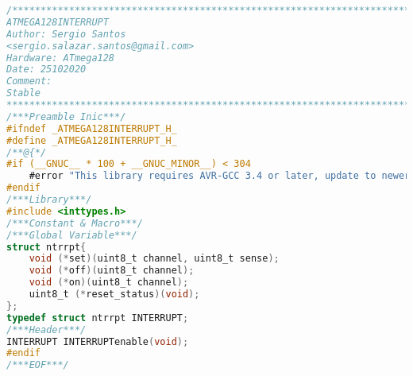 \begin{lstlisting}[language=C, caption={atmega128interrupt.h}, label=atmega128interrupt-h, captionpos=b]
/************************************************************************
ATMEGA128INTERRUPT
Author: Sergio Santos 
<sergio.salazar.santos@gmail.com>
Hardware: ATmega128
Date: 25102020
Comment:
Stable
************************************************************************/
/***Preamble Inic***/
#ifndef _ATMEGA128INTERRUPT_H_
#define _ATMEGA128INTERRUPT_H_
/**@{*/
#if (__GNUC__ * 100 + __GNUC_MINOR__) < 304
	#error "This library requires AVR-GCC 3.4 or later, update to newer AVR-GCC compiler !"
#endif
/***Library***/
#include <inttypes.h>
/***Constant & Macro***/
/***Global Variable***/
struct ntrrpt{
	void (*set)(uint8_t channel, uint8_t sense);
	void (*off)(uint8_t channel);
	void (*on)(uint8_t channel);
	uint8_t (*reset_status)(void);
};
typedef struct ntrrpt INTERRUPT;
/***Header***/
INTERRUPT INTERRUPTenable(void);
#endif
/***EOF***/
\end{lstlisting}
